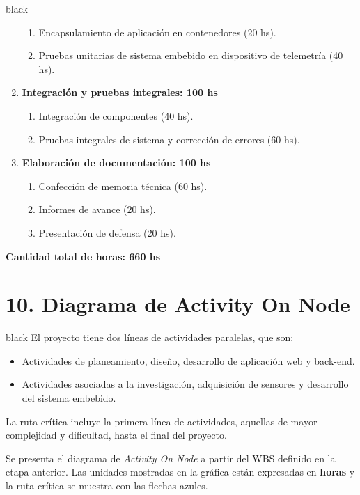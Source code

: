 \documentclass[
11pt, %
codirector, %
]{charter}
\begin{document}
\begin{consigna}{black}
\begin{enumerate}
\begin{enumerate}
	\item Encapsulamiento de aplicación en contenedores (20 hs).
	\item Pruebas unitarias de sistema embebido en dispositivo de telemetría (40 hs).
	\end{enumerate}
\item \textbf{Integración y pruebas integrales: 100 hs}
	\begin{enumerate}
	\item Integración de componentes (40 hs).
	\item Pruebas integrales de sistema y corrección de errores (60 hs).
	\end{enumerate}
\item \textbf{Elaboración de documentación: 100 hs}
	\begin{enumerate}
	\item Confección de memoria técnica (60 hs).
	\item Informes de avance (20 hs).
	\item Presentación de defensa (20 hs).
	\end{enumerate}
\end{enumerate}

\textbf{Cantidad total de horas: 660 hs}

\end{consigna}

\section{10. Diagrama de Activity On Node}
\label{sec:AoN}

\begin{consigna}{black}
El proyecto tiene dos líneas de actividades paralelas, que son:
\begin{itemize}
		\item Actividades de planeamiento, diseño, desarrollo de aplicación web y back-end. 
		\item Actividades asociadas a la investigación, adquisición de sensores y desarrollo del sistema embebido.
\end{itemize}

La ruta crítica incluye la primera línea de actividades, aquellas de mayor complejidad y dificultad, hasta el final del proyecto.

Se presenta el diagrama de \textit{Activity On Node} a partir del WBS definido en la etapa anterior. Las unidades mostradas en la gráfica están expresadas en \textbf{horas} y la ruta crítica se muestra con las flechas azules.




\end{consigna}
\end{document}

